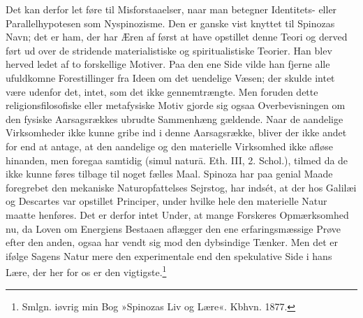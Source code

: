 \documentclass[12pt,a4paper,openany]{book}
\newcommand{\opage}[1]{\marginnote{\footnotesize\textit{[#1]}}}
\begin{document}
\opage{81}Det kan derfor let føre til Misforstaaelser, naar man betegner
Identitets- eller Parallelhypotesen som Nyspinozisme. Den er ganske vist
knyttet til Spinozas Navn; det er ham, der har Æren af først at have
opstillet denne Teori og derved ført ud over de stridende
materialistiske og spiritualistiske Teorier. Han blev herved ledet af to
forskellige Motiver. Paa den ene Side vilde han fjerne alle ufuldkomne
Forestillinger fra Ideen om det uendelige Væsen; der skulde intet være
udenfor det, intet, som det ikke gennemtrængte. Men foruden dette
religionsfilosofiske eller metafysiske Motiv gjorde sig ogsaa
Overbevisningen om den fysiske Aarsagsrækkes ubrudte Sammenhæng
gældende. Naar de aandelige Virksomheder ikke kunne gribe ind i denne
Aarsagsrække, bliver der ikke andet for end at antage, at den aandelige
og den materielle Virksomhed ikke afløse hinanden, men foregaa samtidig
(simul naturā. Eth. III, 2. Schol.), tilmed da de ikke kunne føres
tilbage til noget fælles Maal. Spinoza har paa genial Maade foregrebet
den mekaniske Naturopfattelses Sejrstog, har indsét, at der hos Galilæi
og Descartes var opstillet Principer, under hvilke hele den materielle
Natur maatte henføres. Det er derfor intet Under, at mange Forskeres
Opmærksomhed nu, da Loven om Energiens Bestaaen aflægger den ene
erfaringsmæssige Prøve efter den anden, ogsaa har vendt sig mod den
dybsindige Tænker. Men det er ifølge Sagens Natur mere den experimentale
end den spekulative Side i hans Lære, der her for os er den
vigtigste.\footnote[1]{Smlgn. iøvrig min Bog »Spinozas Liv og Lære«.
Kbhvn. 1877.}
\end{document}
